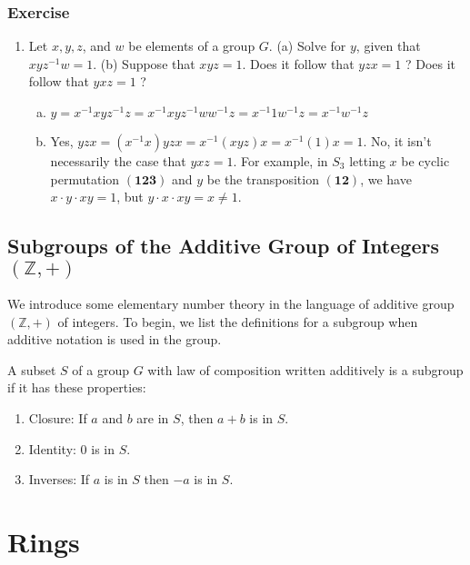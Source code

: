\documentclass[main.tex]{subfiles}
\begin{document}
\subsection{Exercise}
\begin{enumerate}
    \item Let $x, y, z$, and $w$ be elements of a group $G$.
    (a) Solve for $y$, given that $x y z^{-1} w=1$.
    (b) Suppose that $x y z=1$. Does it follow that $y z x=1$ ? Does it follow that $y x z=1$ ?
    \begin{solution}
    \begin{enumerate}[(a)]
        \item $y = x^{-1} x y z^{-1} z = x^{-1} x y z^{-1} w w^{-1} z=x^{-1}1w^{-1} z = x^{-1}w^{-1} z$
        \item Yes, $y z x=(x^{-1}x) y z x= x^{-1}(x y z) x=x^{-1}(1) x=1$. No, it isn't necessarily the case that $y x z=1$. For example, in $S_3$ letting $x$ be cyclic permutation $(\mathbf{123})$ and $y$ be the transposition $(\mathbf{12})$, we have $x \cdot y \cdot x y=1$, but $y \cdot x \cdot x y=x \neq 1$.
    \end{enumerate}
    \end{solution}
\end{enumerate}

\section{Subgroups of the Additive Group of Integers $(\mathbb{Z}, +)$}
We introduce some elementary number theory in the language of additive group $(\mathbb{Z}, +)$ of integers. To begin, we list the definitions for a subgroup when additive notation is used in the group. 
\begin{definition}
A subset $S$ of a group $G$ with law of composition written additively is a subgroup if it has these properties:
\begin{enumerate}
    \item Closure: If $a$ and $b$ are in $S$, then $a+b$ is in $S$.
    \item Identity: 0 is in $S$.
    \item Inverses: If $a$ is in $S$ then $-a$ is in $S$.
\end{enumerate}
\end{definition}
\chapter{Rings}
\end{document}
